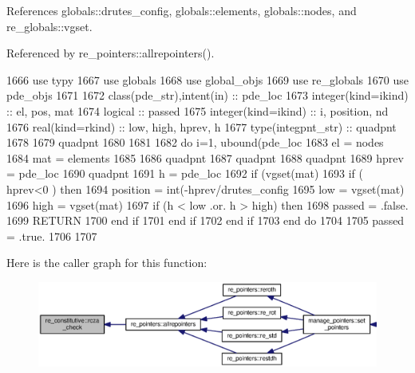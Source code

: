 References globals\+::drutes\+\_\+config, globals\+::elements, globals\+::nodes, and re\+\_\+globals\+::vgset.



Referenced by re\+\_\+pointers\+::allrepointers().


\begin{DoxyCode}
1666         \textcolor{keywordtype}{use }typy
1667         \textcolor{keywordtype}{use }globals
1668         \textcolor{keywordtype}{use }global_objs
1669         \textcolor{keywordtype}{use }re_globals
1670         \textcolor{keywordtype}{use }pde_objs
1671 
1672         \textcolor{keywordtype}{class}(pde_str),\textcolor{keywordtype}{intent(in)} :: pde\_loc
1673         \textcolor{keywordtype}{integer(kind=ikind)} :: el, pos, mat
1674         \textcolor{keywordtype}{logical} :: passed
1675         \textcolor{keywordtype}{integer(kind=ikind)} :: i, position, nd
1676         \textcolor{keywordtype}{real(kind=rkind)} :: low, high, hprev, h
1677         \textcolor{keywordtype}{type}(integpnt_str) :: quadpnt
1678         
1679         quadpnt%
1680                
1681 
1682         \textcolor{keywordflow}{do} i=1, ubound(pde\_loc%
1683           el = nodes%
1684           mat = elements%
1685             
1686           quadpnt%
1687           quadpnt%
1688           quadpnt%
1689           hprev = pde\_loc%
1690           quadpnt%
1691           h = pde\_loc%
1692           \textcolor{keywordflow}{if} (vgset(mat)%
1693             \textcolor{keywordflow}{if} ( hprev<0 ) \textcolor{keywordflow}{then}
1694               position = int(-hprev/drutes_config%
1695               low = vgset(mat)%
1696               high = vgset(mat)%
1697               \textcolor{keywordflow}{if} (h < low .or. h > high) \textcolor{keywordflow}{then}
1698                 passed = .false.
1699                 \textcolor{keywordflow}{RETURN}
1700 \textcolor{keywordflow}{              end if}
1701 \textcolor{keywordflow}{              end if}
1702 \textcolor{keywordflow}{           end if}
1703 \textcolor{keywordflow}{         end do}
1704 
1705         passed = .true.
1706 
1707 
\end{DoxyCode}


Here is the caller graph for this function\+:\nopagebreak
\begin{figure}[H]
\begin{center}
\leavevmode
\includegraphics[width=350pt]{namespacere__constitutive_a9868257a176611d41d573f6fb131fc70_icgraph}
\end{center}
\end{figure}


